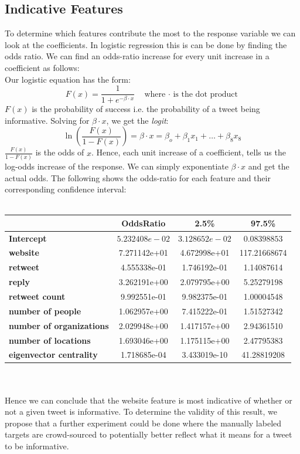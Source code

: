 \documentclass[12pt]{article}
\begin{document}
\subsection{Indicative Features}
To determine which features contribute the most to the response variable we can look at the coefficients. In logistic regression this is can be done by finding the odds ratio. We can find an odds-ratio increase for every unit increase in a coefficient as follows: \\
Our logistic equation has the form:
\[
  F(x) = \frac{1}{1+e^{-\beta\cdot x}} \quad\text{where $\cdot$ is the dot product}
\]
$F(x)$ is the probability of success i.e. the probability of a tweet being informative. Solving for $\beta\cdot x$, we get the {\it logit}:
\[
   \ln\left(\frac{F(x)}{1-F(x)}\right) = \beta\cdot x = \beta_o+\beta_1x_1+\ldots+\beta_8x_8
\]
$\frac{F(x)}{1-F(x)}$ is the odds of $x$. Hence, each unit increase of a coefficient, tells us the log-odds increase of the response. We can simply exponentiate $\beta\cdot x$ and get the actual odds. The following shows the odds-ratio for each feature and their corresponding confidence interval:\\
\\
\begin{centering}
  \begin{tabular}[b]{l||c|c|c} 
    \textbf{} &\textbf{OddsRatio} &\textbf{2.5\%} &\textbf{97.5\%} \\
    \hline
    \textbf{Intercept} &$5.232408e-02$ &$3.128652e-02$ &$0.08398853$ \\
    \hline
    \textbf{website} &7.271142e+01 &4.672998e+01 &117.21668674 \\
    \hline
    \textbf{retweet} &4.555338e-01 &1.746192e-01 &1.14087614 \\
    \hline
    \textbf{reply} &3.262191e+00 &2.079795e+00 &5.25279198 \\
    \hline
    \textbf{retweet count} &9.992551e-01 &9.982375e-01 &1.00004548 \\
    \hline
    \textbf{number of people} &1.062957e+00 &7.415222e-01 &1.51527342 \\
    \hline
    \textbf{number of organizations} &2.029948e+00 &1.417157e+00 &2.94361510 \\
    \hline
    \textbf{number of locations} &1.693046e+00 &1.175115e+00 &2.47795383 \\
    \hline
    \textbf{eigenvector centrality} &1.718685e-04 &3.433019e-10 &41.28819208 \\
  \end{tabular}
\end{centering}\\
\\
Hence we can conclude that the website feature is most indicative of whether or not a given tweet is informative. To determine the validity of this result, we propose that a further experiment could be done where the manually labeled targets are crowd-sourced to potentially better reflect what it means for a tweet to be informative.
\end{document}
